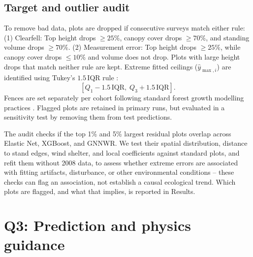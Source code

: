 \subsection*{Target and outlier audit}
To remove bad data, plots are dropped if consecutive surveys match either rule:(1) Clearfell: Top height drops $\ge 25\%$, canopy cover drops $\ge 70\%$, and standing volume drops $\ge 70\%$.
(2) Measurement error: Top height drops $\ge 25\%$, while canopy cover drops $\le 10\%$ and volume does not drop. Plots with large height drops that match neither rule are kept. Extreme fitted ceilings ($\hat{y}_{\max,i}$) are identified using Tukey's $1.5\,\mathrm{IQR}$ rule \cite{tukey1977Exploratory_C5_EVAL}: %
\begin{equation}
\left[Q_1 - 1.5\,\mathrm{IQR},\; Q_3 + 1.5\,\mathrm{IQR}\right].
\label{eq:tukey-fences}
\end{equation}
Fences are set separately per cohort following standard forest growth modelling practices \cite{weiskittel2011forest_C1_SS}. %
Flagged plots are retained in primary runs, but evaluated in a sensitivity test by removing them from test predictions.

The audit checks if the top 1\% and 5\% largest residual plots overlap across Elastic Net, XGBoost, and GNNWR. We test their spatial distribution, distance to stand edges, wind shelter, and local coefficients against standard plots, and refit them without 2008 data, to assess whether extreme errors are associated with fitting artifacts, disturbance, or other environmental conditions -- these checks can flag an association, not establish a causal ecological trend. Which plots are flagged, and what that implies, is reported in Results.

\section{Q3: Prediction and physics guidance}

